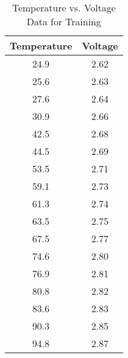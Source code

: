 \documentclass{article}
\begin{document}
\begin{table}[H]
  \centering
  \caption{Temperature vs. Voltage Data for Training}
\vspace{1cm}
  \label{tab:temp_voltage_simple}
  \begin{tabular}{|c|c|}
    \hline
    \textbf{Temperature} & \textbf{Voltage} \\
    \hline
    24.9 & 2.62 \\
    25.6 & 2.63 \\
    27.6 & 2.64 \\
    30.9 & 2.66 \\
    42.5 & 2.68 \\
    44.5 & 2.69 \\
    53.5 & 2.71 \\
    59.1 & 2.73 \\
    61.3 & 2.74 \\
    63.5 & 2.75 \\
    67.5 & 2.77 \\
    74.6 & 2.80 \\
    76.9 & 2.81 \\
    80.8 & 2.82 \\
    83.6 & 2.83 \\
    90.3 & 2.85 \\
    94.8 & 2.87 \\
    \hline
  \end{tabular}
\end{table}
\end{document}
